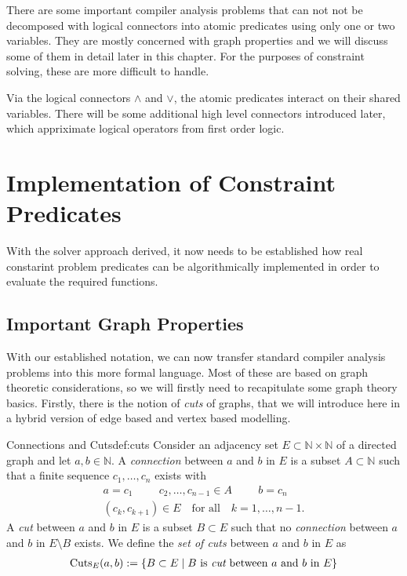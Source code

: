     There are some important compiler analysis problems that can not not be
    decomposed with logical connectors into atomic predicates using only one
    or two variables.
    They are mostly concerned with graph properties and we will discuss some of
    them in detail later in this chapter.
    For the purposes of constraint solving, these are more difficult to handle.

    Via the logical connectors $\land$ and $\lor$, the atomic predicates
    interact on their shared variables.
    There will be some additional high level connectors introduced later, which
    appriximate logical operators from first order logic.

\section{Implementation of Constraint Predicates}

    With the solver approach derived, it now needs to be established how real
    constarint problem predicates can be algorithmically implemented in order
    to evaluate the required functions.

\subsection{Important Graph Properties}

    With our established notation, we can now transfer standard compiler
    analysis problems into this more formal language.
    Most of these are based on graph theoretic considerations, so we
    will firstly need to recapitulate some graph theory basics.
    Firstly, there is the notion of {\em cuts} of graphs, that we will introduce
    here in a hybrid version of edge based and vertex based modelling.

    \begin{definition}{Connections and Cuts}{def:cuts}
        Consider an adjacency set $E\subset\mathbb{N}\times\mathbb{N}$ of a
        directed graph and let $a,b\in\mathbb{N}$.
        \newline
        A {\em connection} between $a$ and $b$ in $E$ is a subset
        $A\subset\mathbb{N}$ such that a finite sequence $c_1,\dots,c_n$
        exists with
        \begin{gather*}
            a=c_1\hspace{1cm}c_2,\dots,c_{n-1}\in A\hspace{1cm}b=c_n\\
            (c_k,c_{k+1})\in E\hspace{1em}\text{for all}\hspace{1em}k=1,\dots,n-1.
        \end{gather*}
        A {\em cut} between $a$ and $b$ in $E$ is a subset $B\subset E$
        such that no {\em connection} between $a$ and $b$ in $E\setminus B$
        exists.
        We define the {\em set of cuts} between $a$ and $b$ in $E$ as
        \begin{align*}
            \text{Cuts}_E(a,b):=\{B\subset E\mid B\text{ is {\em cut} between $a$ and $b$ in $E$}\}
        \end{align*}
    \end{definition}

